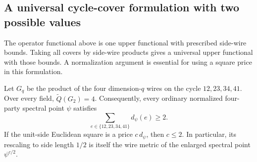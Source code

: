 \subsection{A universal cycle-cover formulation with two possible values}

The operator functional above is one upper functional with prescribed
side-wire bounds. Taking all covers by side-wire products gives a
universal upper functional with those bounds. A normalization argument
is essential for using a square price in this formulation.

\begin{lemma}
\label{pg:cycle-normalization}
Let $G_q$ be the product of the four dimension-$q$ wires on the
cycle $12,23,34,41$. Over every field, $\widetilde Q(G_2)=4$.
Consequently, every ordinary normalized
four-party spectral point $\psi$ satisfies
\[
 \sum_{e\in\{12,23,34,41\}}d_\psi(e)\geq2.
\]
If the unit-side Euclidean square is a price $c\,d_\psi$, then
$c\leq2$. In particular, its rescaling to side length $1/2$ is
itself the wire metric of the enlarged spectral point $\psi^{c/2}$.
\end{lemma}
